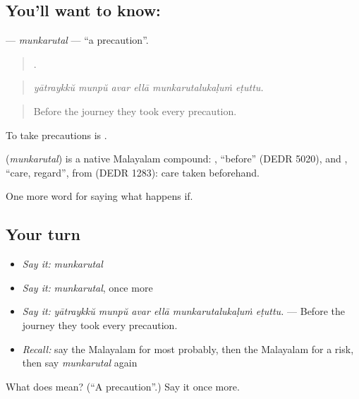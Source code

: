\subsection*{You'll want to know: }
\textbf{} — \emph{munkarutal} — \textquotedblleft{}a precaution\textquotedblright{}.

\begin{quote}
     .
\end{quote}

\begin{quote}
\emph{yātraykkŭ munpŭ avar ellā munkarutalukaḷuṁ eṭuttu.}
\end{quote}

\begin{quote}
Before the journey they took every precaution.
\end{quote}

To take precautions is  .

\begin{cousinweb}
\textbf{} (\emph{munkarutal}) is a native Malayalam compound: , \textquotedblleft{}before\textquotedblright{} (DEDR 5020), and , \textquotedblleft{}care, regard\textquotedblright{}, from  (DEDR 1283): care taken beforehand.
\end{cousinweb}

\begin{grammarlens}[title={What you've built}]
One more word for saying what happens if.
\end{grammarlens}

\subsection*{Your turn}
\begin{itemize}
\raggedright
  \item \emph{Say it:} \emph{munkarutal}
  \item \emph{Say it:} \emph{munkarutal}, once more
  \item \emph{Say it:} \emph{yātraykkŭ munpŭ avar ellā munkarutalukaḷuṁ eṭuttu.} — Before the journey they took every precaution.
  \item \emph{Recall:} say the Malayalam for most probably, then the Malayalam for a risk, then say \emph{munkarutal} again
\end{itemize}

\begin{tcolorbox}[breakable,colback=teal!4,colframe=teal!35!black,title={Before you move on}]
What does  mean? (\textquotedblleft{}A precaution\textquotedblright{}.) Say it once more.
\end{tcolorbox}
